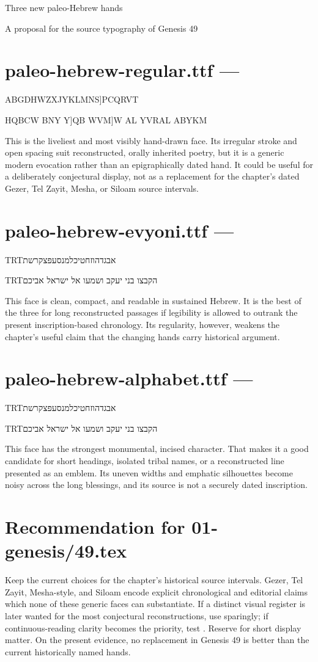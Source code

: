 \documentclass[10pt]{article}
\newcommand{\ASCIISample}[1]{{\PaleoRegular\fontsize{21}{25}\selectfont\color{Paleo}#1\par}}
\newcommand{\HebrewSample}[2]{{\textdir TRT#1\fontsize{19}{24}\selectfont\color{Paleo}#2\par}}
\newcommand{\SampleText}{אבגדהוזחטיכלמנסעפצקרשת}
\newcommand{\JacobText}{הקבצו בני יעקב ושמעו אל ישראל אביכם}
\begin{document}
{\Large Three new paleo-Hebrew hands}\par
{\small A proposal for the source typography of Genesis 49}\par

\section*{paleo-hebrew-regular.ttf --- \texttt{\string\hPaleoZ}}
\ASCIISample{ABGDHWZXJYKLMNS]PCQRVT}
\ASCIISample{HQBCW BNY Y]QB WVM]W AL YVRAL ABYKM}
This is the liveliest and most visibly hand-drawn face. Its irregular stroke and
open spacing suit reconstructed, orally inherited poetry, but it is a generic
modern evocation rather than an epigraphically dated hand. It could be useful
for a deliberately conjectural display, not as a replacement for the chapter's
dated Gezer, Tel Zayit, Mesha, or Siloam source intervals.

\section*{paleo-hebrew-evyoni.ttf --- \texttt{\string\hPaleoAA}}
\HebrewSample{\PaleoEvyoni}{\SampleText}
\HebrewSample{\PaleoEvyoni}{\JacobText}
This face is clean, compact, and readable in sustained Hebrew. It is the best
of the three for long reconstructed passages if legibility is allowed to outrank
the present inscription-based chronology. Its regularity, however, weakens the
chapter's useful claim that the changing hands carry historical argument.

\section*{paleo-hebrew-alphabet.ttf --- \texttt{\string\hPaleoAB}}
\HebrewSample{\PaleoAlphabet}{\SampleText}
\HebrewSample{\PaleoAlphabet}{\JacobText}
This face has the strongest monumental, incised character. That makes it a good
candidate for short headings, isolated tribal names, or a reconstructed line
presented as an emblem. Its uneven widths and emphatic silhouettes become noisy
across the long blessings, and its source is not a securely dated inscription.

\section*{Recommendation for 01-genesis/49.tex}
Keep the current choices for the chapter's historical source intervals. Gezer,
Tel Zayit, Mesha-style, and Siloam encode explicit chronological and editorial
claims which none of these generic faces can substantiate. If a distinct visual
register is later wanted for the most conjectural reconstructions, use
\texttt{\string\hPaleoZ} sparingly; if continuous-reading clarity becomes the
priority, test \texttt{\string\hPaleoAA}. Reserve \texttt{\string\hPaleoAB} for
short display matter. On the present evidence, no replacement in Genesis 49 is
better than the current historically named hands.
\end{document}
